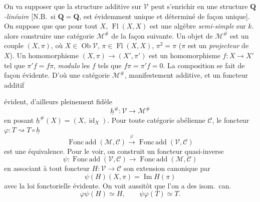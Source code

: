 \documentclass[11pt,a4paper]{article}
\begin{document}
On va supposer que la structure additive sur $\mathcal{V}$ peut
s'enrichir en une structure \emph{$\mathbf{Q}$-linéaire}
[N.B.\ si $\mathbf{Q} = \mathbf{Q}$,  est
évidemment unique et déterminé de façon unique]. On suppose que
que pour tout $X$, $\operatorname{Fl}(X,X)$ est une algèbre \emph{semi-simple}
 sur $k$.  alors construire
une catégorie $\mathcal{M}^{\#}$ de la façon suivante. Un objet de
$\mathcal{M}^{\#}$ est un couple $(X, \pi)$, où $X \in \operatorname{Ob}\mathcal{V}$,
$\pi \in \operatorname{Fl}(X,X)$, $\pi^{2} = \pi$ ($\pi$ est un \emph{projecteur}
de $X$). Un homomorphisme $(X,\pi) \to (X',\pi')$ est un homomorphisme
$f \colon X \to X'$ tel que $\pi' f = f \pi$, \emph{modulo} les $f$ tels que
$f\pi = \pi' f = 0$. La composition se fait de façon évidente. D'où une
catégorie $\mathcal{M}^{\#}$, manifestement additive, et un foncteur additif




évident, d'ailleurs pleinement fidèle
\[
  \underline{h}^{\#} \colon \mathcal{V} \longrightarrow \mathcal{M}^{\#}
\]
en posant $\underline{h}^{\#}(X) = (X, \operatorname{id}_{X})$. Pour toute
catégorie abélienne $\mathcal{C}$, le foncteur
$\varphi \colon T \rightsquigarrow T \circ \underline{h}$
\[
  \operatorname{Fonc\,add}(\mathcal{M}, \mathcal{C})
  \xrightarrow{\ \varphi\ } \operatorname{Fonc\,add}(\mathcal{V}, \mathcal{C})
\]
est une  \struck{\ill{}} équivalence. Pour le voir, on
construit un foncteur quasi-inverse
\[
  \psi \colon \operatorname{Fonc\,add}(\mathcal{V}, \mathcal{C})
  \longrightarrow \operatorname{Fonc\,add}(\mathcal{M}, \mathcal{C})
\]
en associant à tout foncteur  $H \colon \mathcal{V} \to
\mathcal{C}$ son extension canonique par
\[
  \psi(H)(X,\pi) = \operatorname{Im} H(\pi)
\]
avec la loi fonctorielle évidente. On voit aussitôt que l'on a des isom.\ can.
\[
  \varphi\psi(H) \simeq H, \qquad \psi\varphi(T) \simeq T .
\]
\end{document}
